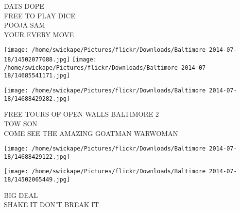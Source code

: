 \documentclass[10pt,letterpaper]{article}
\begin{document}
DATS DOPE\\
FREE TO PLAY DICE\\
POOJA SAM\\
YOUR EVERY MOVE
\pagebreak

\texttt{[image: /home/swickape/Pictures/flickr/Downloads/Baltimore 2014-07-18/14502077088.jpg]}
\texttt{[image: /home/swickape/Pictures/flickr/Downloads/Baltimore 2014-07-18/14685541171.jpg]}

\vspace{0.25in}
\texttt{[image: /home/swickape/Pictures/flickr/Downloads/Baltimore 2014-07-18/14688429282.jpg]}

FREE TOURS OF OPEN WALLS BALTIMORE 2\\
TOW SON\\
COME SEE THE AMAZING GOATMAN WARWOMAN
\pagebreak

\texttt{[image: /home/swickape/Pictures/flickr/Downloads/Baltimore 2014-07-18/14688429122.jpg]}

\vspace{0.25in}
\texttt{[image: /home/swickape/Pictures/flickr/Downloads/Baltimore 2014-07-18/14502065449.jpg]}

BIG DEAL\\
SHAKE IT DON'T BREAK IT
\pagebreak
\end{document}
